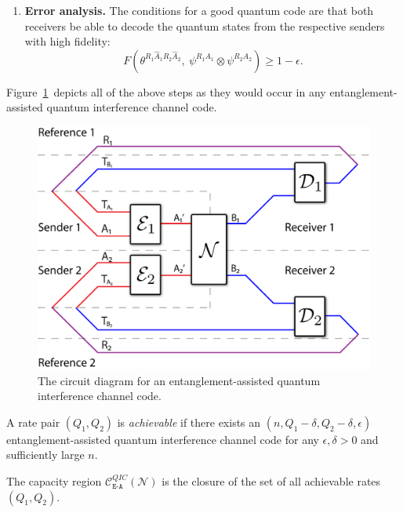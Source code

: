 \documentclass[aps,11pt,twoside,letterpaper]{article}
\begin{document}
\begin{enumerate}
		
		\item {\bf Error analysis.} 
		The conditions for a good quantum code are that both receivers be
		 able to decode the quantum states from the
		respective senders with high fidelity:%
		\[
		F\left( \theta^{R_{1}\hat{A}_{1}R_{2}\hat{A}_{2}}, \  
			\psi^{R_{1}A_{1}}\otimes\psi^{R_{2}A_{2}} \right) \geq 1- \epsilon.
		\]
		
		\end{enumerate}
		
		Figure~\ref{fig:interference-protocol}\ depicts all of the above steps as
		they would occur in any entanglement-assisted quantum interference channel code.
		\begin{figure}[hptb]
		\begin{center}
		\includegraphics[width=5in]{interference-protocol.png}
		\caption{The circuit diagram for an entanglement-assisted quantum interference
		channel code. }%
		\label{fig:interference-protocol}%
		\end{center}
		\end{figure}

		
		\begin{definition}
			A rate pair $(Q_{1},Q_{2})$ is \textit{achievable} if there exists an
			$(n,Q_{1}-\delta,Q_{2}-\delta,\epsilon)$ entanglement-assisted quantum
			interference channel code for any $\epsilon,\delta>0$ and sufficiently large
			$n$.
		\end{definition}

		\begin{definition}
			The capacity region
			$\mathcal{C}^{QIC}_{\texttt{E-A}}\!\left(\mathcal{N}\right)$
			is the closure of the set of all achievable rates $(Q_{1},Q_{2})$.
		\end{definition}
\end{document}

